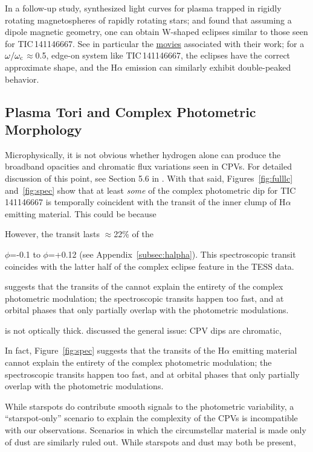 \documentclass[11pt,twocolumn,tighten,linenumbers]{aastex7}
\begin{document}
In a follow-up study, \citet{Townsend2008} synthesized light curves
for plasma trapped in rigidly rotating magnetospheres of rapidly
rotating stars; and found that assuming a dipole magnetic geometry,
one can obtain W-shaped eclipses similar to those seen for
TIC\,141146667.  See in particular the
\href{http://user.astro.wisc.edu/~townsend/static.php?ref=rrm-movies#Download_Bundles}{movies}
associated with their work; for a $\omega/\omega_{\rm c}$$\approx$0.5,
edge-on system like TIC\,141146667, the eclipses have the correct
approximate shape, and the H$\alpha$ emission can similarly exhibit
double-peaked behavior.


\subsection{Plasma Tori and Complex Photometric Morphology}

Microphysically, it is not obvious whether hydrogen alone can produce
the broadband opacities and chromatic flux variations seen in CPVs.
For detailed discussion of this point, see Section 5.6 in
\citet{Bouma2024}.
With that said, Figures~\ref{fig:fulllc} and~\ref{fig:spec} show that
at least {\it some} of the complex photometric dip for TIC\,141146667
is temporally coincident with the transit of the inner clump of
H$\alpha$ emitting material.
This could be because 

However, the transit lasts $\approx$22\% of the 

$\phi$=-0.1 to $\phi$=+0.12 (see
Appendix~\ref{subsec:halpha}).  This spectroscopic transit coincides with
the latter half of the complex eclipse feature in the TESS data.

 suggests that the transits of the
 cannot explain the entirety of the complex
photometric modulation;  the spectroscopic transits happen too fast,
and at orbital phases that only partially overlap with the photometric
modulations.

is not optically thick.
 discussed the general issue: CPV dips are chromatic, 

In
fact, Figure~\ref{fig:spec} suggests that the transits of the
H$\alpha$ emitting material cannot explain the entirety of the complex
photometric modulation;  the spectroscopic transits happen too fast,
and at orbital phases that only partially overlap with the photometric
modulations.


While starspots do
contribute smooth signals to the photometric variability, a
``starspot-only'' scenario to explain the complexity of the CPVs
\citep{Koen2021} is incompatible with our observations.  Scenarios in
which the circumstellar material is made only of dust are similarly
ruled out.  While starspots and dust may both be present, 
\end{document}
